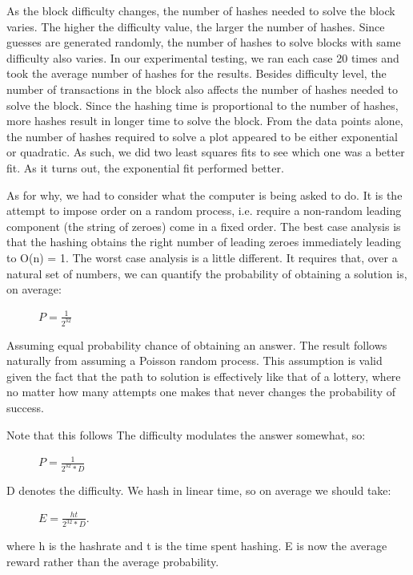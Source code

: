 \documentclass[pdftex,11pt]{article}
\begin{document}
As the block difficulty changes, the number of hashes needed to solve the block varies. The higher the difficulty value, the larger the number of hashes. Since guesses are generated randomly, the number of hashes to solve blocks with same difficulty also varies. In our experimental testing, we ran each case 20 times and took the average number of hashes for the results. Besides difficulty level, the number of transactions in the block also affects the number of hashes needed to solve the block. Since the hashing time is proportional to the number of hashes, more hashes result in longer time to solve the block. From the data points alone, the number of hashes required to solve a plot appeared to be either exponential or quadratic. As such, we did two least squares fits to see which one was a better fit. As it turns out, the exponential fit performed better. 

As for why, we had to consider what the computer is being asked to do. It is the attempt to impose order on a random process, i.e. require a non-random leading component (the string of zeroes) come in a fixed order. The best case analysis is that the hashing obtains the right number of leading zeroes immediately leading to O(n) = 1. The worst case analysis is a little different. It requires that, over a natural set of numbers, we can quantify the probability of obtaining a solution is, on average:

\begin{figure}[H]
	\centering
 	$P = \frac{1}{2^{32}}$
 \end{figure}

Assuming equal probability chance of obtaining an answer. The result follows naturally from assuming a Poisson random process. This assumption is valid given the fact that the path to solution is effectively like that of a lottery, where no matter how many attempts one makes that never changes the probability of success.

Note that this follows
The difficulty modulates the answer somewhat, so:
\begin{figure}[H]
	\centering
 	$P = \frac{1}{2^{32}*D}$
 \end{figure}

D denotes the difficulty.
We hash in linear time, so on average we should take:
\begin{figure}[H]
	\centering
 	$E = \frac{ht}{2^{32}*D}$.
 \end{figure}

where h is the hashrate and t is the time spent hashing. E is now the average reward rather than the average probability.
\end{document}
